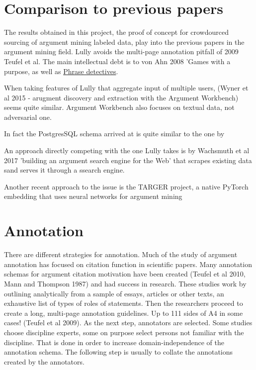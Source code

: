 \documentclass{report}
\begin{document}
\section{Comparison to previous papers}
The results obtained in this project, the proof of concept for crowdourced sourcing of argument mining labeled data, play into the previous papers in the argument mining field.
Lully avoids the multi-page annotation pitfall of 2009 Teufel et al.
The main intellectual debt is to von Ahn 2008 'Games with a purpose, as well as \href{https://dl.acm.org/doi/10.1145/2448116.2448119}{Phrase detectives}.

When taking features of Lully that aggregate input of multiple users, (Wyner et al 2015 - arugment discovery and extraction with the Argument Workbench) seems quite similar. Argument Workbench also focuses on textual data, not adversarial one. 

In fact the PostgresSQL schema arrived at is quite similar to the one by 


An approach directly competing with the one Lully takes is by Wachsmuth et al 2017 'building an argument search engine for the Web' that scrapes existing data sand serves it through a ssearch engine.


Another recent approach to the issue is the TARGER project, a native PyTorch embedding that uses neural networks for argument mining



\section{Annotation}
There are different strategies for annotation. Much of the study of argument annotation has focused on citation function in scientific papers.
Many annotation schemas for argument citation motivation have been created (Teufel et al 2010, Mann and Thompson 1987) and had success in research.
These studies work by outlining analytically from a sample of essays, articles or other texts, an exhaustive list of types of roles of statements.
Then the researchers proceed to create a long, multi-page annotation guidelines. Up to 111 sides of A4 in some cases! (Teufel et al 2009).
As the next step, annotators are selected. Some studies choose discipline experts, some on purpose select persons not familiar with the discipline.
That is done in order to increase domain-independence of the annotation schema.
The following step is usually to collate the annotations created by the annotators. 
\end{document}
